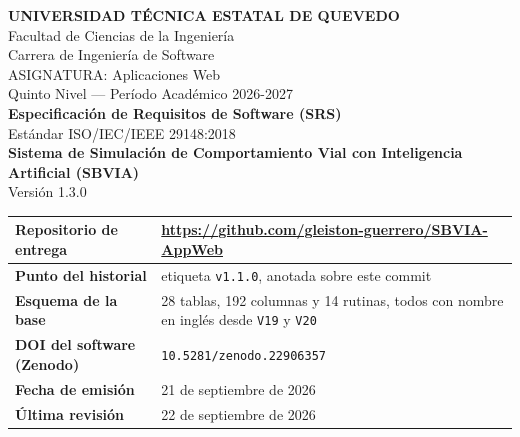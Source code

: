 \documentclass[11pt,a4paper]{article}
\begin{document}
\begin{titlepage}
    \centering
    \vspace*{1cm}
    {\LARGE \textbf{UNIVERSIDAD TÉCNICA ESTATAL DE QUEVEDO}}\\[0.5cm]
    {\large Facultad de Ciencias de la Ingeniería}\\[0.2cm]
    {\large Carrera de Ingeniería de Software}\\[0.8cm]
    
    {\large ASIGNATURA: Aplicaciones Web}\\[0.2cm]
    {\large Quinto Nivel — Período Académico 2026-2027}\\[1cm]
    
    {\Huge \bfseries Especificación de Requisitos de Software (SRS)}\\[0.5cm]
    {\large Estándar ISO/IEC/IEEE 29148:2018}\\[1cm]
    
    {\huge \bfseries \color{uteqblue} Sistema de Simulación de Comportamiento Vial con Inteligencia Artificial (SBVIA)}\\[0.5cm]
    {\Large Versión 1.3.0}\\[1cm]
    
    \begin{table}[h]
        \centering
        \renewcommand{\arraystretch}{1.5}
        \begin{tabularx}{\textwidth}{|l|X|}
            \hline
            \textbf{Repositorio de entrega} & \url{https://github.com/gleiston-guerrero/SBVIA-AppWeb} \\ \hline
            \textbf{Punto del historial} & etiqueta \texttt{v1.1.0}, anotada sobre este commit \\ \hline
            \textbf{Esquema de la base} & 28 tablas, 192 columnas y 14 rutinas, todos con nombre en inglés desde \texttt{V19} y \texttt{V20} \\ \hline
            \textbf{DOI del software (Zenodo)} & \texttt{10.5281/zenodo.22906357} \\ \hline
            \textbf{Fecha de emisión} & 21 de septiembre de 2026 \\ \hline
            \textbf{Última revisión} & 22 de septiembre de 2026 \\ \hline
        \end{tabularx}
    \end{table}

    \vfill


\end{titlepage}
\end{document}
